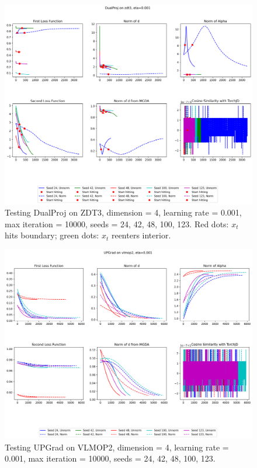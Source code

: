 \documentclass{article}
\renewcommand{\|}{\biggr|}
\begin{document}
\begin{center}
\begin{figure}[h]
        \end{figure}
        \begin{figure}[h]
            \includegraphics[scale=0.4]{DualProj_zdt3.png}
            \caption{Testing DualProj on ZDT3, dimension = 4, learning rate = 0.001, max iteration = 10000, seeds = 24, 42, 48, 100, 123. Red dots: $x_t$ hits boundary; green dots: $x_t$ reenters interior.}
        \end{figure}
        \begin{figure}[h]
            \includegraphics[scale=0.4]{UPGrad_vlmop2.png}
            \caption{Testing UPGrad on VLMOP2, dimension = 4, learning rate = 0.001, max iteration = 10000, seeds = 24, 42, 48, 100, 123.}

\end{figure}
\end{center}
\end{document}
